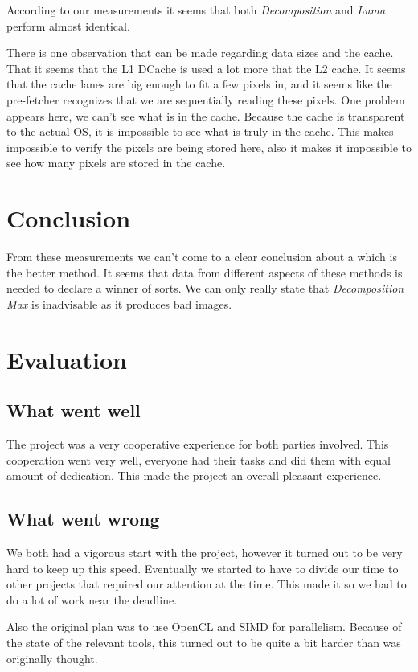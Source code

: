 \documentclass[a4paper]{article}
\begin{document}
According to our measurements it seems that both \textit{Decomposition} and \textit{Luma} perform almost identical.

There is one observation that can be made regarding data sizes and the cache. That it seems that the L1 DCache is used a lot more that the L2 cache. It seems that the cache lanes are big enough to fit a few pixels in, and it seems like the pre-fetcher recognizes that we are sequentially reading these pixels.
One problem appears here, we can't see what is in the cache. Because the cache is transparent to the actual OS, it is impossible to see what is truly in the cache. This makes impossible to verify the pixels are being stored here, also it makes it impossible to see how many pixels are stored in the cache.

\section{Conclusion}
From these measurements we can't come to a clear conclusion about a which is the better method. It seems that data from different aspects of these methods is needed to declare a winner of sorts. We can only really state that \textit{Decomposition Max} is inadvisable as it produces bad images.

\section{Evaluation}
\subsection{What went well}
The project was a very cooperative experience for both parties involved. This cooperation went very well, everyone had their tasks and did them with equal amount of dedication. This made the project an overall pleasant experience.
\subsection{What went wrong}
We both had a vigorous start with the project, however it turned out to be very hard to keep up this speed. Eventually we started to have to divide our time to other projects that required our attention at the time. This made it so we had to do a lot of work near the deadline.

Also the original plan was to use OpenCL and SIMD for parallelism. Because of the state of the relevant tools, this turned out to be quite a bit harder than was originally thought.
\end{document}
